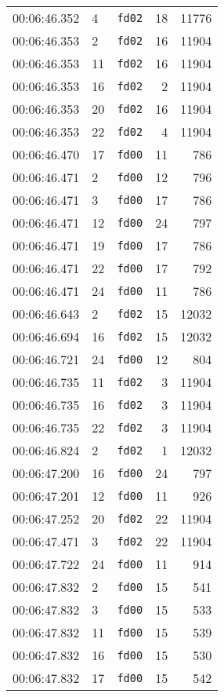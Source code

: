 \documentclass{article}
\begin{document}
\begin{longtable}{lllrr}
00:06:46.352 & 4 & \texttt{fd02} & 18 & 11776 \\
00:06:46.353 & 2 & \texttt{fd02} & 16 & 11904 \\
00:06:46.353 & 11 & \texttt{fd02} & 16 & 11904 \\
00:06:46.353 & 16 & \texttt{fd02} & 2 & 11904 \\
00:06:46.353 & 20 & \texttt{fd02} & 16 & 11904 \\
00:06:46.353 & 22 & \texttt{fd02} & 4 & 11904 \\
00:06:46.470 & 17 & \texttt{fd00} & 11 & 786 \\
00:06:46.471 & 2 & \texttt{fd00} & 12 & 796 \\
00:06:46.471 & 3 & \texttt{fd00} & 17 & 786 \\
00:06:46.471 & 12 & \texttt{fd00} & 24 & 797 \\
00:06:46.471 & 19 & \texttt{fd00} & 17 & 786 \\
00:06:46.471 & 22 & \texttt{fd00} & 17 & 792 \\
00:06:46.471 & 24 & \texttt{fd00} & 11 & 786 \\
00:06:46.643 & 2 & \texttt{fd02} & 15 & 12032 \\
00:06:46.694 & 16 & \texttt{fd02} & 15 & 12032 \\
00:06:46.721 & 24 & \texttt{fd00} & 12 & 804 \\
00:06:46.735 & 11 & \texttt{fd02} & 3 & 11904 \\
00:06:46.735 & 16 & \texttt{fd02} & 3 & 11904 \\
00:06:46.735 & 22 & \texttt{fd02} & 3 & 11904 \\
00:06:46.824 & 2 & \texttt{fd02} & 1 & 12032 \\
00:06:47.200 & 16 & \texttt{fd00} & 24 & 797 \\
00:06:47.201 & 12 & \texttt{fd00} & 11 & 926 \\
00:06:47.252 & 20 & \texttt{fd02} & 22 & 11904 \\
00:06:47.471 & 3 & \texttt{fd02} & 22 & 11904 \\
00:06:47.722 & 24 & \texttt{fd00} & 11 & 914 \\
00:06:47.832 & 2 & \texttt{fd00} & 15 & 541 \\
00:06:47.832 & 3 & \texttt{fd00} & 15 & 533 \\
00:06:47.832 & 11 & \texttt{fd00} & 15 & 539 \\
00:06:47.832 & 16 & \texttt{fd00} & 15 & 530 \\
00:06:47.832 & 17 & \texttt{fd00} & 15 & 542 \\

\end{longtable}
\end{document}
